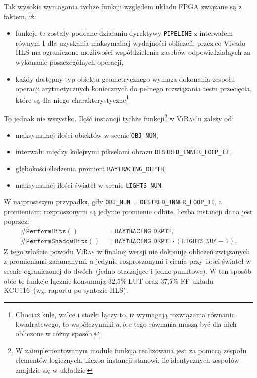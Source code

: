 \begin{enumerate}
Tak wysokie wymagania tychże funkcji względem układu FPGA związane są z faktem, iż:
\begin{itemize}
\item funkcje te zostały poddane działaniu dyrektywy \texttt{PIPELINE} z interwałem równym 1 dla uzyskania maksymalnej wydajności obliczeń, przez co Vivado HLS ma ograniczone możliwości współdzielenia zasobów odpowiedzialnych za wykonanie poszczególnych operacji,
\item każdy dostępny typ obiektu geometrycznego wymaga dokonania zespołu operacji arytmetycznych koniecznych do pełnego rozwiązania testu przecięcia, które są dla niego charakterystyczne\footnote{Chociaż kule, walce i stożki łączy to, iż wymagają rozwiązania równania kwadratowego, to współczynniki $a, b, c$ tego równania muszą być dla nich obliczone w różny sposób.}
\end{itemize}
To jednak nie wszystko. Ilość instancji tychże funkcji\footnote{W zaimplementowanym module funkcja realizowana jest za pomocą zespołu elementów logicznych. Liczba instancji stanowi, ile identycznych zespołów znajdzie się w układzie.} w \textsc{ViRay}'u zależy od:
\begin{itemize}
\item maksymalnej ilości obiektów w scenie \texttt{OBJ\_NUM},
\item interwału między kolejnymi pikselami obrazu \texttt{DESIRED\_INNER\_LOOP\_II},
\item głębokości śledzenia promieni \texttt{RAYTRACING\_DEPTH},
\item maksymalnej ilości świateł w scenie \texttt{LIGHTS\_NUM}.
\end{itemize}
W najprostszym przypadku, gdy \texttt{OBJ\_NUM} = \texttt{DESIRED\_INNER\_LOOP\_II}, a promieniami rozproszonymi są jedynie promienie odbite, liczba instancji dana jest poprzez:
\begin{align*}
\#\mathtt{PerformHits()} &= \mathtt{RAYTRACING\_DEPTH},\\
\#\mathtt{PerformShadowHits()} &= \mathtt{RAYTRACING\_DEPTH} \cdot \left(\mathtt{LIGHTS\_NUM} - 1\right).
\end{align*}
Z tego właśnie powodu \textsc{ViRay} w finalnej wersji nie dokonuje obliczeń związanych z promieniami załamanymi, a jedynie rozproszonymi i cienia przy ilości świateł w scenie ograniczonej do dwóch~(jedno otaczające i jedno punktowe). W ten sposób obie te funkcje łącznie konsumują 32,5\% LUT oraz 37,5\% FF układu KCU116~(wg. raportu po syntezie HLS). 


\end{enumerate}
